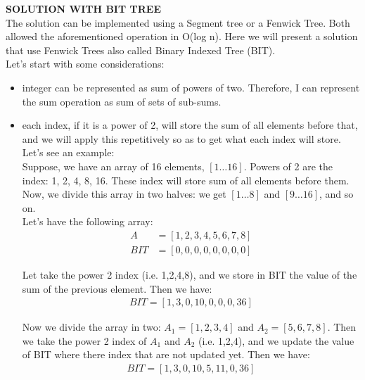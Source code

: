 \documentclass[a4paper]{article}
\begin{document}
\textbf{SOLUTION WITH BIT TREE}
\\
The solution can be implemented using a Segment tree or a Fenwick Tree. Both allowed the aforementioned operation in O(log n). Here we will present a solution that use Fenwick Trees also called Binary Indexed Tree (BIT).\\
Let's start with some considerations: 
\begin{itemize}
\item integer can be represented as sum of powers of two. Therefore, I can represent the sum operation as sum of sets of sub-sums.
\item each index, if it is a power of 2, will store the sum of all elements before that, and we will apply this repetitively so as to get what each index will store. Let's see an example:
\\ 
Suppose, we have an array of 16 elements, $[1 \dots 16]$. Powers of 2 are the index: 1, 2, 4, 8, 16. These index will store sum of all elements before them. Now, we divide this array in two halves: we get $[1 \dots 8]$ and $[9 \dots 16]$, and so on. \\
Let's have the following array: 
\begin{align}
\nonumber
A  &=[1,2,3,4,5,6,7,8]\\
BIT&=[0,0,0,0,0,0,0,0]
\end{align}

Let take the power 2 index (i.e. 1,2,4,8), and we store in BIT the value of the sum of the previous element. Then we have:
\begin{align}
\nonumber
BIT=[1,3,0,10,0,0,0,36]
\end{align}

Now we divide the array in two: $A_1=[1,2,3,4]$ and $A_2=[5,6,7,8]$. Then we take the power 2 index of $A_1$ and $A_2$ (i.e. 1,2,4), and we update the value of BIT where there index that are not updated yet. Then we have:
\begin{align}
\nonumber
BIT=[1,3,0,10,5,11,0,36]
\end{align}


\end{itemize}
\end{document}
